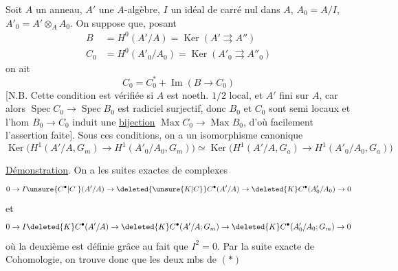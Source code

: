   Soit $A$ un anneau, $A'$ une $A$-algèbre, $I$ un
idéal  de carré nul dans $A$, $A_0=A/I$, $A'_0=A'\otimes_A A_0$.
On suppose que, 
posant
\[
\begin{aligned}
B&=H^0(A'/A)=\operatorname{Ker}(A'\rightrightarrows A'')\\
C_0&=H^0(A'_0/A_0)=\operatorname{Ker}(A'_0\rightrightarrows A''_0)
\end{aligned}
\]
on ait
\[
C_0=C_0^*+\operatorname{Im}(B\to C_0)
\]
[N.B. Cette condition est vérifiée si $A$ est noeth. $1/2$ local,
et $A'$ fini sur $A$, car alors $\operatorname{Spec} C_0\to\operatorname{Spec} B_0$ est
radiciel surjectif, donc $B_0$ et $C_0$ sont semi locaux et
l'hom $B_0\to C_0$ induit une \uline{bijection} $\operatorname{Max} C_0\to\operatorname{Max} B_0$,
d'où facilement l'assertion faite]. Sous ces
conditions, on a un isomorphisme canonique
\[
\operatorname{Ker}\big(H^1(A'/A,G_m)\to H^1(A'_0/A_0,G_m)\big)\simeq
\operatorname{Ker}\big(H^1(A'/A,G_a)\to H^1(A'_0/A_0,G_a)\big) \tag*{$(*)$}
\]

\uline{Démonstration}. On a les suites exactes de complexes
\[
0\to I\unsure{C^{\bullet}|C^{\cdot}}(A'/A)\to \deleted{\unsure{K|C}}C^{\bullet}(A'/A)\to \deleted{K}C^{\bullet}(A'_0/A_0)\to0
\]
et
\[
0\to I\deleted{K}C^{\bullet}(A'/A)\to \deleted{K}C^{\bullet}(A'/A;G_m)\to \deleted{K}C^{\bullet}(A'_0/A_0;G_m)\to0
\]
où la deuxième est définie grâce au fait que
$I^2=0$. Par la suite exacte de Cohomologie,
on trouve donc que les deux mbs de $(*)$
